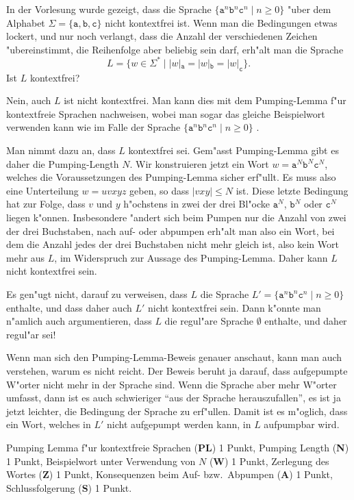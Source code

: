 In der Vorlesung wurde gezeigt, dass die Sprache
$\{\texttt{a}^n\texttt{b}^n\texttt{c}^n\;|\;n\ge 0\}$
"uber dem Alphabet $\Sigma=\{\texttt{a},\texttt{b},\texttt{c}\}$
nicht kontextfrei ist.
Wenn man die Bedingungen etwas lockert, und nur noch verlangt, dass die
Anzahl der verschiedenen Zeichen "ubereinstimmt, die Reihenfolge aber
beliebig sein darf, erh"alt man die Sprache
\[
L=\{w\in\Sigma^*\;|\;|w|_\texttt{a}=|w|_\texttt{b}=|w|_\texttt{c}\}.
\]
Ist $L$ kontextfrei?

\begin{loesung}
Nein, auch $L$ ist nicht kontextfrei.
Man kann dies mit dem Pumping-Lemma f"ur kontextfreie Sprachen nachweisen,
wobei man sogar das gleiche Beispielwort verwenden kann wie im Falle der
Sprache $\{ \texttt{a}^n \texttt{b}^n \texttt{c}^n\;|\; n \ge 0\}$ .

Man nimmt dazu an, dass $L$ kontextfrei sei.
Gem"asst Pumping-Lemma gibt es daher die Pumping-Length $N$.
Wir konstruieren jetzt ein Wort
$w=\texttt{a}^N\texttt{b}^N\texttt{c}^N$, welches die Voraussetzungen
des Pumping-Lemma sicher erf"ullt.
Es muss also eine Unterteilung $w=uvxyz$ geben, so dass $|vxy|\le N$ ist.
Diese letzte Bedingung hat zur Folge, dass $v$ und $y$ h"ochstens in
zwei der drei Bl"ocke $\texttt{a}^N$, $\texttt{b}^N$ oder $\texttt{c}^N$ liegen k"onnen.
Insbesondere "andert sich beim Pumpen nur die Anzahl von zwei der drei
Buchstaben, nach auf- oder abpumpen erh"alt man also ein Wort, bei dem 
die Anzahl jedes der drei Buchstaben nicht mehr gleich ist, also kein
Wort mehr aus $L$, im Widerspruch zur Aussage des Pumping-Lemma.
Daher kann $L$ nicht kontextfrei sein.
\end{loesung}

\begin{diskussion}
Es gen"ugt nicht, darauf zu verweisen, dass $L$ die Sprache
$L'=\{ \texttt{a}^n \texttt{b}^n \texttt{c}^n\;|\; n\ge 0\}$ enthalte,
und dass daher auch $L'$ nicht kontextfrei sein.  Dann k"onnte man n"amlich auch
argumentieren, dass $L$ die regul"are Sprache $\emptyset$ enthalte, und daher
regul"ar sei!

Wenn man sich den Pumping-Lemma-Beweis genauer anschaut, kann man auch verstehen,
warum es nicht reicht. Der Beweis beruht ja darauf, dass aufgepumpte W"orter nicht
mehr in der Sprache sind. Wenn die Sprache aber mehr W"orter umfasst, dann ist
es auch schwieriger ``aus der Sprache herauszufallen'', es ist ja jetzt leichter,
die Bedingung der Sprache zu erf"ullen. Damit ist es m"oglich, dass ein Wort, welches
in $L'$ nicht aufgepumpt werden kann, in $L$ aufpumpbar wird.
\end{diskussion}

\begin{bewertung}
Pumping Lemma f"ur kontextfreie Sprachen ({\bf PL}) 1 Punkt,
Pumping Length ({\bf N}) 1 Punkt,
Beispielwort unter Verwendung von $N$ ({\bf W}) 1 Punkt,
Zerlegung des Wortes ({\bf Z}) 1 Punkt,
Konsequenzen beim Auf- bzw.~Abpumpen ({\bf A}) 1 Punkt,
Schlussfolgerung ({\bf S}) 1 Punkt.
\end{bewertung}

